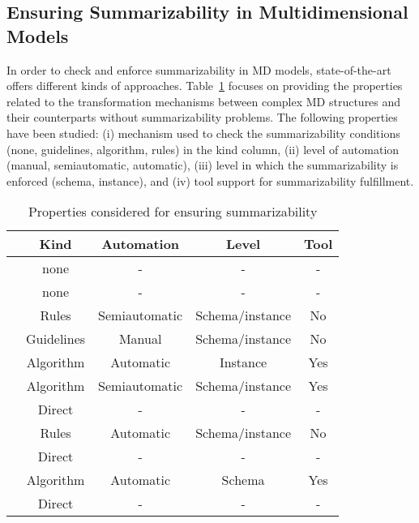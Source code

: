 \subsection{Ensuring Summarizability in Multidimensional Models}
In order to check and enforce summarizability in MD models,
state-of-the-art offers different kinds of approa\-ches.
Table~\ref{a1:tab:related2} focuses on providing the properties
related to the transformation mechanisms between complex MD
structures and their counterparts without summarizability problems.
The following properties have been studied: (i) mechanism used to
check the summarizability conditions (none, guidelines, algorithm,
rules) in the kind column, (ii) level of automation (manual,
semiautomatic, automatic), (iii) level in which the summarizability
is enforced (schema, instance), and (iv) tool support for
summarizability fulfillment.

\begin{table}
    \centering
       \caption{Properties considered for ensuring summarizability}
    \label{a1:tab:related2}
        \begin{tabular}{|c|c|c|c|c|}
        \hline
        & Kind  & Automation & Level & Tool\\
        \hline
        \hline
        \cite{DBLP:journals/dke/Lujan-MoraTS06} & none & - & - & - \\
        \cite{DBLP:journals/is/AbelloSS06} & none & - & - & - \\
        \cite{DBLP:conf/er/AkokaCP01,DBLP:journals/dss/PratAC06} & Rules & Semiautomatic & Schema/instance & No \\
        \cite{DBLP:conf/caise/MalinowskiZ04,DBLP:journals/dke/MalinowskiZ06} & Guidelines & Manual & Schema/instance & No \\
        \cite{DBLP:conf/vldb/PedersenJD99,DBLP:journals/is/PedersenJD01} & Algorithm & Automatic & Instance & Yes \\
        \cite{DBLP:conf/dawak/MansmannS06,MansmannIJDWDM07} & Algorithm & Semiautomatic & Schema/instance & Yes \\
        \cite{DBLP:journals/ijcis/GolfarelliMR98} & Direct & - & - & - \\
        \cite{DBLP:conf/dmdw/HusemannLV00,DBLP:journals/is/LechtenborgerV03} & Rules & Automatic & Schema/instance & No \\
        \cite{book/Kimball/DW} & Direct & - & - & - \\
        \cite{DBLP:journals/tods/HurtadoGM05} & Algorithm & Automatic & Schema &  Yes \\
        \cite{DBLP:conf/dmdw/SongRME01} & Direct & - & - & - \\
        \hline
        \end{tabular}
\end{table}

